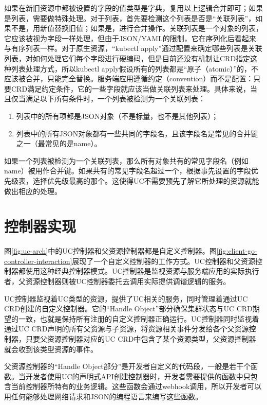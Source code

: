 \documentclass[macfonts,master]{njuthesis}
\begin{document}
如果在新旧资源中都被设置的字段的值类型是字典，复用以上逻辑合并即可；如果是列表，需要做特殊处理。对于列表，首先要检测这个列表是否是``关联列表''，如果不是，用新值替换旧值；如果是，进行合并操作。关联列表是一个对象的列表，它应该被视为字段一样处理，但由于JSON/YAML的限制，它在序列化后看起来与有序列表一样。对于原生资源，``kubectl apply''通过配置来确定哪些列表是关联列表，对如何处理它们每个字段进行硬编码，但是目前还没有机制让CRD指定这种列表处理方式，所以kubectl apply假设所有的列表都是``原子（atomic）''的，不应该被合并，只能完全替换。服务端应用遵循约定（convention）而不是配置：只要CRD满足约定条件，它的一些字段就应该当做关联列表来处理。具体来说，当且仅当满足以下所有条件时，一个列表被检测为一个关联列表：

\begin{enumerate}
	\item 列表中的所有项都是JSON对象（不是标量，也不是其他列表）；
	\item 列表中的所有JSON对象都有一些共同的字段名，且该字段名是常见的合并键之一（最常见的是name）。
\end{enumerate}

如果一个列表被检测为一个关联列表，那么所有对象共有的常见字段名（例如name）被用作合并键。如果共有的常见字段名超过一个，根据事先设置的字段优先级表，选择优先级最高的那个。这使得UC不需要预先了解它所处理的资源就能做出相应的处理。


\section{控制器实现}

图\ref{fig:uc-arch}中的UC控制器和父资源控制器都是自定义控制器。图\ref{fig:client-go-controller-interaction}展现了一个自定义控制器的工作方式。UC控制器和父资源控制器都使用这种经典控制器模式。UC控制器是监视资源与服务端应用的实际执行者，父资源控制器则被UC控制器委托去调用实际提供调谐逻辑的服务。

UC控制器监视着UC类型的资源，提供了UC相关的服务，同时管理着通过UC CRD创建的自定义控制器。它的``Handle Object''部分确保集群状态与UC CRD期望的一致，也就是保持所有注册的自定义控制器正确运行。UC控制器同时监视着通过UC CRD声明的所有父资源与子资源，将资源相关事件分发给各个父资源控制器，只要父资源控制器对应的UC CRD中包含了某个资源类型，父资源控制器就会收到该类型资源的事件。

父资源控制器的``Handle Object部分''是开发者自定义的代码段，一般是若干个函数。当开发者使用UC的声明式API创建控制器时，开发者需要提供的函数中只包含当前控制器所特有的业务逻辑。这些函数会通过webhook调用，所以开发者可以用任何能够处理网络请求和JSON的编程语言来编写这些函数。
\end{document}

